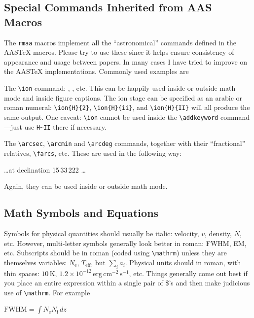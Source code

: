 \documentclass[preprint]{rmxac}
\newcommand{\CS}[1]{\texttt{\textbackslash #1}}
\newenvironment{Example}
{\begin{list}{}{\setlength{\leftmargin}{5pt}\setlength{\rightmargin}{5pt}}\item[]}
  {\end{list}}
\begin{document}
\subsection{Special Commands Inherited from AAS Macros}
\label{sec:command}

The \texttt{rmaa} macros implement all the ``astronomical'' commands
defined in the AAS\TeX{} macros. Please try to use these since it
helps ensure consistency of appearance and usage between papers. In
many cases I have tried to improve on the AAS\TeX{}
implementations. Commonly used examples are 
\begin{asparaitem}
\item The \CS{ion} command: , , etc. This can
  be happily used inside or outside math mode and inside figure
  captions. The ion stage can be specified as an arabic or roman
  numeral: \verb+\ion{H}{2}+, \verb+\ion{H}{ii}+, and
  \verb+\ion{H}{II}+ will all produce the same output. One caveat:
  \CS{ion} cannot be used inside the \CS{addkeyword} command---just
  use \verb+H~II+ there if necessary.
\item The \CS{arcsec}, \CS{arcmin} and \CS{arcdeg} commands, together
  with their ``fractional'' relatives, \CS{farcs}, etc. These are used
  in the following way: 
  \begin{Example}
    \dots at declination 15\arcdeg\,33\arcmin\,22\farcs{}2 \dots
  \end{Example}
  Again, they can be used inside or outside math mode. 
\end{asparaitem}


\subsection{Math Symbols and Equations}
\label{sec:math}

Symbols for physical quantities should usually be italic: velocity,
$v$, density, $N$, etc. However, multi-letter symbols generally look
better in roman: FWHM, EM, etc. Subscripts should be in roman (coded
using \CS{mathrm}) unless they are themselves variables:
$N_\mathrm{e}$, $T_\mathrm{eff}$, but $\sum_i a_i$. Physical units
should in roman, with thin spaces: $10\,\mathrm{K}$, $1.2\times
10^{-12} \,\mathrm{erg\,cm^{-2}\,s^{-1}}$, etc. Things generally come
out best if you place an entire expression within a single pair of
\$'s and then make judicious use of \CS{mathrm}. For example
\begin{Example}
  $ \mathrm{FWHM} = \int N_\mathrm{e} N_\mathrm{i} \, dz $ 
\end{Example}
\end{document}

